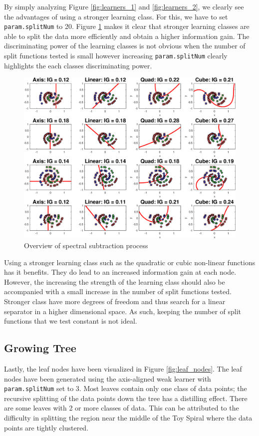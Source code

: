 \documentclass[a4paper,pra,twocolumn,10pt,aps,longbibliography,nobalancelastpage]{revtex4-1}
\begin{document}
By simply analyzing Figure \ref{fig:learners_1} and \ref{fig:learners_2}, we clearly see the advantages of using a stronger learning class. For this, we have to set \texttt{param.splitNum} to 20. Figure \ref{fig:learners_3} makes it clear that stronger learning classes are able to split the data more efficiently and obtain a higher information gain. The discriminating power of the learning classes is not obvious when the number of split functions tested is small however increasing \texttt{param.splitNum} clearly highlights the each classes discriminating power. 

\begin{figure}[H]
	\centering
    \includegraphics[width=0.60\columnwidth]{split_function_visualitions_5}
    \caption{Overview of spectral subtraction process}
    \label{fig:learners_3}
\end{figure}

Using a stronger learning class such as the quadratic or cubic non-linear functions has it benefits. They do lead to an increased information gain at each node. However, the increasing the strength of the learning class should also be accompanied with a small increase in the number of split functions tested. Stronger class have more degrees of freedom and thus search for a linear separator in a higher dimensional space. As such, keeping the number of split functions that we test constant is not ideal.

\subsection{Growing Tree}
Lastly, the leaf nodes have been visualized in Figure \ref{fig:leaf_nodes}. The leaf nodes have been generated using the axis-aligned weak learner with \texttt{param.splitNum} set to 3. Most leaves contain only one class of data points; the recursive splitting of the data points down the tree has a distilling effect. There are some leaves with 2 or more classes of data. This can be attributed to the difficulty in splitting the region near the middle of the Toy Spiral where the data points are tightly clustered.
\end{document}
